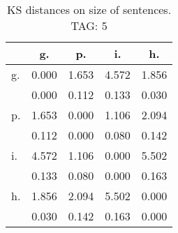 \begin{table}[h!]
\begin{center}
\begin{tabular}{| l | c | c | c | c |}\hline
 & g. & p. & i. & h. \\\hline
g. & 0.000  & 1.653  & 4.572  & 1.856 \\\hline
 & 0.000  & 0.112  & 0.133  & 0.030 \\\hline
p. & 1.653  & 0.000  & 1.106  & 2.094 \\\hline
 & 0.112  & 0.000  & 0.080  & 0.142 \\\hline
i. & 4.572  & 1.106  & 0.000  & 5.502 \\\hline
 & 0.133  & 0.080  & 0.000  & 0.163 \\\hline
h. & 1.856  & 2.094  & 5.502  & 0.000 \\\hline
 & 0.030  & 0.142  & 0.163  & 0.000 \\\hline
\end{tabular}
\caption{KS distances on size of sentences. TAG: 5}
\end{center}
\end{table}